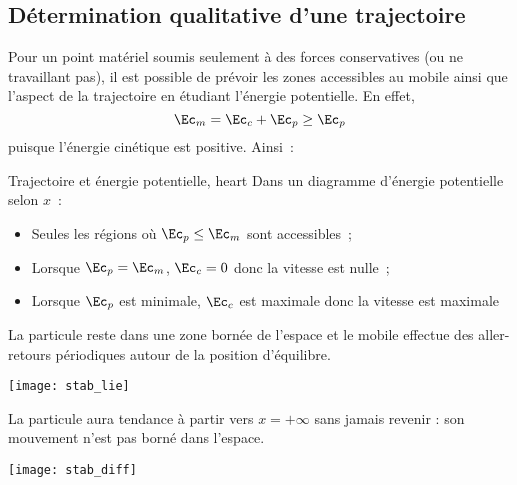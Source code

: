 \documentclass[../main/main.tex]{subfiles}
\begin{document}
\subsection{Détermination qualitative d'une trajectoire}
Pour un point matériel soumis seulement à des forces conservatives (ou ne
travaillant pas), il est possible de prévoir les zones accessibles au mobile
ainsi que l'aspect de la trajectoire en étudiant l'énergie potentielle. En
effet,
\[\Ec_m = \Ec_c + \Ec_p \geq \Ec_p\]
puisque l'énergie cinétique est positive. Ainsi~:
\begin{tror}{Trajectoire et énergie potentielle, heart}
    Dans un diagramme d'énergie potentielle selon $x$~:
    \begin{itemize}
        \item Seules les régions où $\Ec_p \leq \Ec_m$ sont accessibles~;
        \item Lorsque $\Ec_p = \Ec_m$, $\Ec_c = 0$ donc la vitesse est nulle~;
        \item Lorsque $\Ec_p$ est minimale, $\Ec_c$ est maximale donc la vitesse
            est maximale
    \end{itemize}\bigbreak
    \begin{minipage}{0.47\linewidth}
        \begin{center}
            \bfseries
        \end{center}
        La particule reste dans une zone bornée de l’espace et le mobile effectue
        des aller-retours périodiques autour de la position d’équilibre.
        \begin{center}
            \texttt{[image: stab\_lie]}
        \end{center}
    \end{minipage}
    \hfill
    \begin{minipage}{0.47\linewidth}
        \begin{center}
            \bfseries
        \end{center}
        La particule aura tendance à partir vers $x = +\infty$ sans jamais revenir :
        son mouvement n’est pas borné dans l’espace.
        \begin{center}
            \texttt{[image: stab\_diff]}
        \end{center}
    \end{minipage}
\end{tror}
\end{document}
